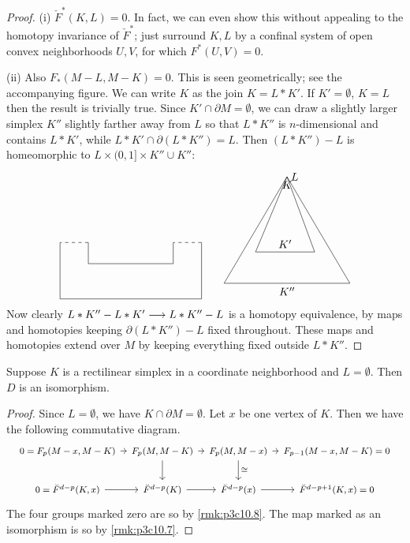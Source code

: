 \documentclass[../main]{subfiles}
\begin{document}
\begin{proof}
(i) $\check{F}^*(K,L) = 0$. In fact, we can even show this without appealing to the homotopy invariance of $\check{F}^*$; just surround $K,L$ by a confinal system of open convex neighborhoods $U,V$, for which $F^*(U,V) = 0$.

(ii) Also $F_*(M-L,M-K) = 0$. This is seen geometrically; see the accompanying figure. We can write $K$ as the join $K = L * K'$. If $K' = \emptyset$, $K = L$ then the result is trivially true.  Since $K' \cap \partial M = \emptyset$, we can draw a slightly larger simplex $K''$ slightly farther away from $L$ so that $L*K''$ is $n$-dimensional and contains $L * K'$, while $L*K' \cap \partial(L*K'') = L$. Then $(L*K'')-L$ is homeomorphic to $L \times (0,1] \times K'' \cup K''$:
\[
\begin{tikzpicture}[scale = .9]
    \draw (0, 2) to (0, 0) to (5, 0) to (5, 2);
    \draw[dashed] (5, 2) to (4, 2);
    \draw (4, 2) to (4, 1.25) to (1, 1.25) to (1, 2);
    \draw[dashed] (1, 2) to (0, 2);
\end{tikzpicture}\qquad
\begin{tikzpicture}[scale = .8]
    \draw (0, 0) to node[below] {$K''$} (5, 0) to (2.5, 4.25) node[right] {$L$} to cycle;
    
    \draw (2.5, 4.25) node[below=0.5] {$K$} to (1.25, 1.25) to node[above] {$K'$} (3.6, 1.25) to cycle;
\end{tikzpicture}
\]
Now clearly $L*K'' - L*K' \longrightarrow L*K'' - L$ is a homotopy equivalence, by maps and homotopies keeping $\partial(L* K'') - L$ fixed throughout. These maps and homotopies extend over $M$ by keeping everything fixed outside $L*K''$. 
\end{proof}
\begin{remark}\label{rmk:p3c10.9}
Suppose $K$ is a rectilinear simplex in a coordinate neighborhood and $L = \emptyset$. Then $D$ is an isomorphism.
\end{remark}
\begin{proof}
Since $L = \emptyset$, we have $K \cap \partial M = \emptyset$. Let $x$ be one vertex of $K$. Then we have the following commutative diagram.
\[
\begin{tikzcd}[column sep = tiny, font = \footnotesize]
0 = {F_p(M -x, M - K)} \arrow[r]       & {F_p(M, M- K)} \arrow[d] \arrow[r] & {F_p(M, M - x)} \arrow[d, "\cong"] \arrow[r] & {F_{p - 1}(M - x, M - K)} = 0 \\
0 = {\breve F^{d - p}(K, x)} \arrow[r] & \breve F^{d - p}(K) \arrow[r]      & \breve F^{d - p}(x) \arrow[r]                & {\breve F^{d - p + 1}(K, x)} = 0
\end{tikzcd}
\]
The four groups marked zero are so by \ref{rmk:p3c10.8}. The map marked as an isomorphism is so by \ref{rmk:p3c10.7}.
\end{proof}
\end{document}
